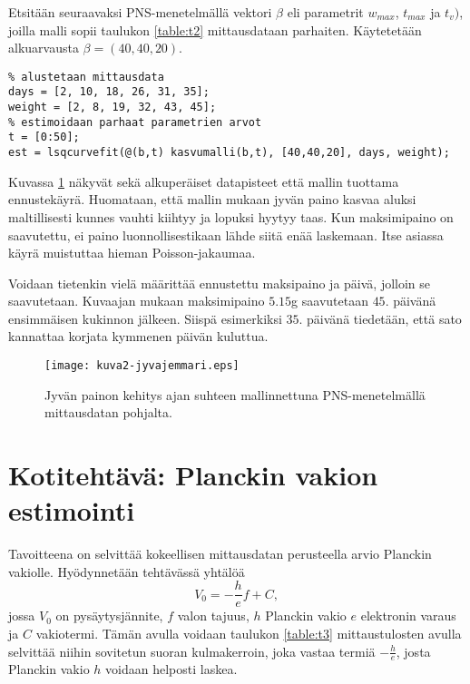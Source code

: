 \documentclass[a4paper,11pt]{article}
\begin{document}
{Etsitään seuraavaksi PNS-menetelmällä vektori $\beta$ eli parametrit $w_{max}$, $t_{max}$ ja $t_v)$, joilla malli sopii taulukon \ref{table:t2} mittausdataan parhaiten. Käytetetään alkuarvausta $\beta = (40, 40, 20)$.

\begin{lstlisting}
% alustetaan mittausdata
days = [2, 10, 18, 26, 31, 35];
weight = [2, 8, 19, 32, 43, 45];
% estimoidaan parhaat parametrien arvot
t = [0:50];
est = lsqcurvefit(@(b,t) kasvumalli(b,t), [40,40,20], days, weight);
\end{lstlisting}

Kuvassa \ref{fig:k2} näkyvät sekä alkuperäiset datapisteet että mallin tuottama ennustekäyrä. Huomataan, että mallin mukaan jyvän paino kasvaa aluksi maltillisesti kunnes vauhti kiihtyy ja lopuksi hyytyy taas. Kun maksimipaino on saavutettu, ei paino luonnollisestikaan lähde siitä enää laskemaan. Itse asiassa käyrä muistuttaa hieman Poisson-jakaumaa.

Voidaan tietenkin vielä määrittää ennustettu maksipaino ja päivä, jolloin se saavutetaan. Kuvaajan mukaan maksimipaino $5.15$g saavutetaan $45.$ päivänä ensimmäisen kukinnon jälkeen. Siispä esimerkiksi $35.$ päivänä tiedetään, että sato kannattaa korjata kymmenen päivän kuluttua.

\begin{figure}
    \centering
    \texttt{[image: kuva2-jyvajemmari.eps]}
    \caption{Jyvän painon kehitys ajan suhteen mallinnettuna PNS-menetelmällä mittausdatan pohjalta.}
    \label{fig:k2}
\end{figure}

\section{Kotitehtävä: Planckin vakion estimointi}

Tavoitteena on selvittää kokeellisen mittausdatan perusteella arvio Planckin vakiolle. Hyödynnetään tehtävässä yhtälöä
\begin{equation}
    V_0 = - \frac{h}{e}f+C,
\end{equation}
jossa $V_0$ on pysäytysjännite, $f$ valon tajuus, $h$ Planckin vakio $e$ elektronin varaus ja $C$ vakiotermi. Tämän avulla voidaan taulukon \ref{table:t3} mittaustulosten avulla selvittää niihin sovitetun suoran kulmakerroin, joka vastaa termiä $-\frac{h}{e}$, josta Planckin vakio $h$ voidaan helposti laskea.

}
\end{document}
